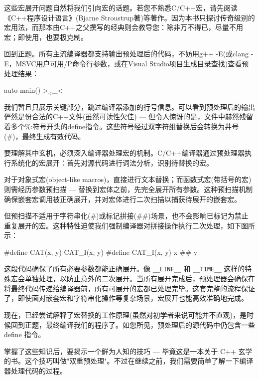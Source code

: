 这些宏展开问题自然将我们引向宏的话题。若您不熟悉C/C++宏，请先阅读《C++程序设计语言》(Bjarne Stroustrup著)等著作。因为本书只探讨传奇级别的宏用法，而那本由C++之父撰写的经典则会教导您：除非万不得已，尽量不用宏；即使用，也要极克制。

回到正题。所有主流编译器都支持输出预处理后的代码，不妨用g++ -E(或clang -E，MSVC用户可用/P命令行参数，或在Visual Studio项目生成目录查找)查看预处理结果：

\begin{shell}
auto main()->$_<%
$_<%
\end{shell}

我们暂且只展示关键部分，跳过编译器添加的行号信息。可以看到预处理后的输出俨然是份合法的C++文件(虽然可读性欠佳) --- 但令人惊讶的是，文件中赫然残留着多个\%:符号开头的define指令。这些符号经过双字符组替换后会转换为井号(\#)，最终生成有效代码。

要理解其中玄机，必须深入编译器处理宏的机制。C/C++编译器通过预处理器执行系统化的宏展开：首先对源代码进行词法分析，识别待替换的宏。

对于对象式宏(object-like macros)，直接进行文本替换；而函数式宏(带括号的宏)则需经历参数预扫描 --- 替换到宏体之前，先完全展开所有参数。这种预扫描机制确保嵌套宏调用被正确展开，并对宏体进行二次扫描以捕获待展开的嵌套宏。

但预扫描不适用于字符串化(\#)或标记拼接(\#\#)场景，也不会影响已标记为禁止重复展开的宏。这种特性迫使我们强制编译器对拼接操作执行二次处理，如下图所示：

\begin{cpp}
#define CAT(x, y) CAT_I(x, y)
#define CAT_I(x, y) x ## y
\end{cpp}

这段代码确保了所有必要参数都能正确展开。像 \verb|__LINE__| 和 \verb|__TIME__| 这样的特殊宏会单独处理，以防止意外的二次展开。当所有展开完成后，预处理器会确保在将最终代码传递给编译器前，所有可展开的宏都已处理完毕。这套完整的流程保证了，即使面对嵌套宏和字符串化操作等复杂场景，宏展开也能高效准确地完成。

现在，已经尝试解释了宏替换的工作原理(虽然对初学者来说可能并不直观)，是时候回到正题，最终编译我们的程序了。如您所见，预处理后的源代码中仍包含一些 define 指令。

掌握了这些知识后，要揭示一个鲜为人知的技巧 --- 毕竟这是一本关于 C++ 玄学的书。这个技巧叫做"双重预处理"。不过在继续之前，我们需要简单了解一下编译器处理代码的过程。

